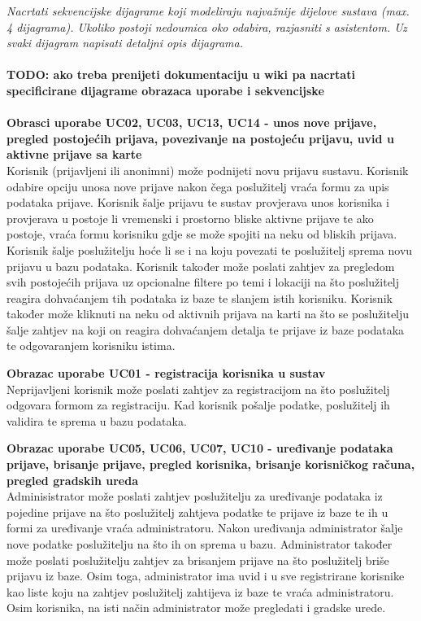 				
				\textit{Nacrtati sekvencijske dijagrame koji modeliraju najvažnije dijelove sustava (max. 4 dijagrama). Ukoliko postoji nedoumica oko odabira, razjasniti s asistentom. Uz svaki dijagram napisati detaljni opis dijagrama.}
				\\
				\\
				\textbf{TODO: ako treba prenijeti dokumentaciju u wiki pa nacrtati specificirane dijagrame obrazaca uporabe i sekvencijske}
				\\
				\\
				\textbf{Obrasci uporabe UC02, UC03, UC13, UC14 - unos nove prijave, pregled postojećih prijava, povezivanje na postojeću prijavu, uvid u aktivne prijave sa karte}\\
				Korisnik (prijavljeni ili anonimni) može podnijeti novu prijavu sustavu. Korisnik odabire opciju unosa nove prijave nakon čega poslužitelj vraća formu za upis podataka prijave. 
				Korisnik šalje prijavu te sustav provjerava unos korisnika i provjerava u postoje li vremenski i prostorno bliske aktivne prijave te ako postoje, vraća formu korisniku gdje se može spojiti na neku od bliskih prijava. 
				Korisnik šalje poslužitelju hoće li se i na koju povezati te poslužitelj sprema novu prijavu u bazu podataka. Korisnik također može poslati zahtjev za pregledom svih postojećih prijava uz opcionalne filtere po temi i lokaciji na što poslužitelj reagira dohvaćanjem tih podataka iz baze te slanjem istih korisniku. 
				Korisnik također može kliknuti na neku od aktivnih prijava na karti na što se poslužitelju šalje zahtjev na koji on reagira dohvaćanjem detalja te prijave iz baze podataka te odgovaranjem korisniku istima.
				
				
				\textbf{Obrazac uporabe UC01 - registracija korisnika u sustav}\\
				Neprijavljeni korisnik može poslati zahtjev za registracijom na što poslužitelj odgovara formom za registraciju. Kad korisnik pošalje podatke, poslužitelj ih validira te sprema u bazu podataka.

				\textbf{Obrazac uporabe UC05, UC06, UC07, UC10 - uređivanje podataka prijave, brisanje prijave, pregled korisnika, brisanje korisničkog računa, pregled gradskih ureda}\\
				Adminisistrator može poslati zahtjev poslužitelju za uređivanje podataka iz pojedine prijave na što poslužitelj zahtjeva podatke te prijave iz baze te ih u formi za uređivanje vraća administratoru. Nakon uređivanja administrator šalje nove podatke poslužitelju na što ih on sprema u bazu.
				Administrator također može poslati poslužitelju zahtjev za brisanjem prijave na što poslužitelj briše prijavu iz baze.
				Osim toga, administrator ima uvid i u sve registrirane korisnike kao liste koju na zahtjev poslužitelj zahtijeva iz baze te vraća administratoru.
				Osim korisnika, na isti način administrator može pregledati i gradske urede.


